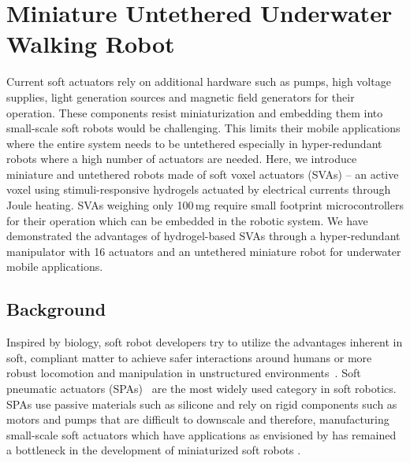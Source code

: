 \graphicspath{{Images/untetheredWalker/}}

\chapter{Miniature Untethered Underwater Walking Robot}
\label{chap:untetheredWalker}
Current soft actuators rely on additional hardware such as pumps, high voltage supplies, light generation sources and magnetic field generators for their operation. 
These components resist miniaturization and embedding them into small-scale soft robots would be challenging. This limits their mobile applications where the entire system needs to be untethered especially in hyper-redundant robots where a high number of actuators are needed. Here, we introduce miniature and untethered robots made of soft voxel actuators (SVAs) -- an active voxel using stimuli-responsive hydrogels actuated by electrical currents through Joule heating. SVAs weighing only 100\,mg require small footprint microcontrollers for their operation which can be embedded in the robotic system. We have demonstrated the advantages of hydrogel-based SVAs through a hyper-redundant manipulator with 16 actuators and an untethered miniature robot for underwater mobile applications.
\section{Background}
Inspired by biology, soft robot developers try to utilize the advantages inherent in soft, compliant matter to achieve safer interactions around humans or more robust locomotion and manipulation in unstructured environments~\cite{martinez2013robotic,laschi2012soft,tolley2014resilient,bilodeau2015monolithic}.  
Soft pneumatic actuators (SPAs)~\cite{Gorissen2017, branyan2017soft} are the most widely used category in soft robotics. SPAs use passive materials such as silicone and rely on rigid components such as motors and pumps that are difficult to downscale and therefore, manufacturing small-scale soft actuators which have applications as envisioned by \cite{hines2017soft} has remained a bottleneck in the development of miniaturized soft robots \cite{majidi2019soft}. 

